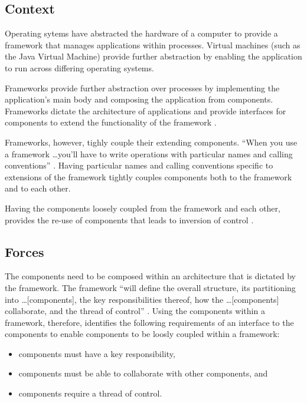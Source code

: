 \documentclass[prodmode]{style/acmlarge}
\begin{document}
\subsection{Context}

Operating sytems have abstracted the hardware of a computer to provide a
framework that manages applications within processes.  Virtual machines (such as
the Java Virtual Machine) provide further abstraction by enabling the
application to run across differing operating systems.

Frameworks provide further abstraction over processes by implementing the
application's main body and composing the application from components. 
Frameworks dictate the architecture of applications and provide interfaces for
components to extend the functionality of the framework \cite{gof}.

Frameworks, however, tighly couple their extending components.  ``When you use a
framework \ldots you'll have to write operations with particular names and
calling conventions'' \cite[p. 27]{gof}.  Having particular names and calling
conventions specific to extensions of the framework  tightly couples components
both to the framework and to each other.

Having the components loosely coupled from the framework and each other,
provides the re-use of components that leads to inversion of control \cite{gof}.


\subsection{Forces}

The components need to be composed within an architecture that is dictated by
the framework.  The framework ``will define the overall structure, its
partitioning into \ldots [components], the key responsibilities thereof, how the
\ldots [components] collaborate, and the thread of control'' \cite[p.26]{gof}.
Using the components within a framework, therefore, identifies the following
requirements of an interface to the components to enable components to be loosly
coupled within a framework:
\begin{itemize}
  \item components must have a key responsibility,
  \item components must be able to collaborate with other components, and
  \item components require a thread of control.
\end{itemize}
\end{document}
